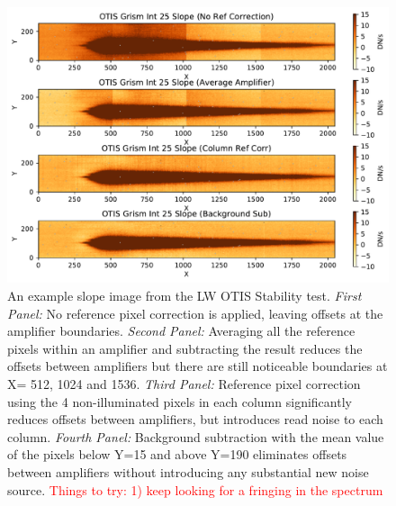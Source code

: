 \documentclass{aastex62}
\begin{document}
\begin{figure}[!hbtp]
\centering
\includegraphics[width=.99\columnwidth]{amplifier_offsets_in_otis_lw_grism.pdf}
\caption{An example slope image from the LW OTIS Stability test.
{\it First Panel:} No reference pixel correction is applied, leaving offsets at the amplifier boundaries.
{\it Second Panel:} Averaging all the reference pixels within an amplifier and subtracting the result reduces the offsets between amplifiers but there are still noticeable boundaries at X= 512, 1024 and 1536.
{\it Third Panel:} Reference pixel correction using the 4 non-illuminated pixels in each column significantly reduces offsets between amplifiers, but introduces read noise to each column.
{\it Fourth Panel:} Background subtraction with the mean value of the pixels below Y=15 and above Y=190 eliminates offsets between amplifiers without introducing any substantial new noise source.
\textcolor{red}{Things to try: 1) keep looking for a fringing in the spectrum}
}\label{fig:ampOffsetsOtisGrismSlope}
\end{figure}
\end{document}
